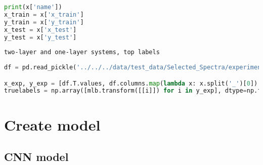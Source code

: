 \begin{lstlisting}[language=Python]
print(x['name'])
x_train = x['x_train']
y_train = x['y_train']
x_test = x['x_test']
y_test = x['y_test']
\end{lstlisting}

\begin{lstlisting}
two-layer and one-layer systems, top labels
\end{lstlisting}

\begin{lstlisting}[language=Python]
df = pd.read_pickle('../../../data/test_data/Selected_Spectra/experimental_data_elemental.pkl')

x_exp, y_exp = [df.T.values, df.columns.map(lambda x: x.split('_')[0]).values] # top layer
truelabels = np.array([mlb.transform([[i]]) for i in y_exp], dtype=np.float32)
\end{lstlisting}

\hypertarget{create-model}{%
\section*{Create model}\label{create-model}}

\hypertarget{cnn-model}{%
\subsection*{CNN model}\label{cnn-model}}

